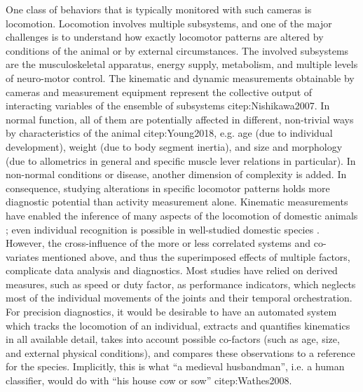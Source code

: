 \documentclass[10pt,a4paper]{article}
\begin{document}
One class of behaviors that is typically monitored with such cameras is locomotion.
Locomotion involves multiple subsystems, and one of the major challenges is to understand how exactly locomotor patterns are altered by conditions of the animal or by external circumstances.
The involved subsystems are the musculoskeletal apparatus, energy supply, metabolism, and multiple levels of neuro-motor control.
The kinematic and dynamic measurements obtainable by cameras and measurement equipment represent the collective output of interacting variables of the ensemble of subsystems citep:Nishikawa2007.
In normal function, all of them are potentially affected in different, non-trivial ways by characteristics of the animal citep:Young2018, e.g. age (due to individual development), weight (due to body segment inertia), and size and morphology (due to allometrics in general and specific muscle lever relations in particular).
In non-normal conditions or disease, another dimension of complexity is added.
In consequence, studying alterations in specific locomotor patterns holds more diagnostic potential than activity measurement alone.
Kinematic measurements have enabled the inference of many aspects of the locomotion of domestic animals \citep[e.g.][]{SchlageterTello2014,SerraBraganca2018,Qiao2021,Netukova2021}; even individual recognition is possible in well-studied domestic species \citep[e.g.][]{Figueiredo2018,Patua2021}.
However, the cross-influence of the more or less correlated systems and co-variates mentioned above, and thus the superimposed effects of multiple factors, complicate data analysis and diagnostics.
Most studies have relied on derived measures, such as speed or duty factor, as performance indicators, which neglects most of the individual movements of the joints and their temporal orchestration.
For precision diagnostics, it would be desirable to have an automated system which tracks the locomotion of an individual, extracts and quantifies kinematics in all available detail, takes into account possible co-factors (such as age, size, and external physical conditions), and compares these observations to a reference for the species.
Implicitly, this is what ``a medieval husbandman'', i.e. a human classifier, would do with ``his house cow or sow'' citep:Wathes2008.
\end{document}
